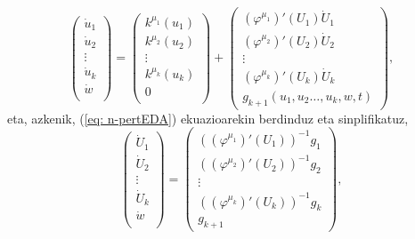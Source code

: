 \begin{equation*}
\left(\begin{array}{c}
                \dot{u}_1  \\
                \dot{u}_2  \\
                \vdots \\
                \dot{u}_k    \\
                \dot{w}      \\
\end{array}\right)=
\left(\begin{array}{c}
                k^{\mu_1}(u_1)  \\
                k^{\mu_2}(u_2)  \\
                \vdots \\
                k^{\mu_k}(u_k)  \\
                0      \\
\end{array}\right)+
\left(\begin{array}{c}
      (\varphi^{\mu_1})'(U_1) \dot{U}_1 \\
      (\varphi^{\mu_2})'(U_2) \dot{U}_2 \\
                \vdots \\
      (\varphi^{\mu_k})'(U_k) \dot{U}_k\\
      g_{k+1}(u_1, u_2\dots, u_k,w,t)
\end{array}\right),
\end{equation*}
eta, azkenik, (\ref{eq: n-pertEDA}) ekuazioarekin berdinduz eta sinplifikatuz,
\begin{equation*}
\left(\begin{array}{c}
                \dot{U}_1  \\
                \dot{U}_2  \\
                \vdots \\
                \dot{U}_k    \\
                \dot{w}      \\
\end{array}\right)=
\left(\begin{array}{c}
      \left((\varphi^{\mu_1})'(U_1)\right)^{-1} g_1 \\
      \left((\varphi^{\mu_2})'(U_2)\right)^{-1} g_2 \\
                \vdots \\
     \left((\varphi^{\mu_k})'(U_k)\right)^{-1} g_k\\
      g_{k+1}
\end{array}\right),
\end{equation*}

